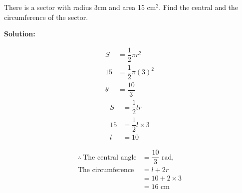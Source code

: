 \documentclass{report}
\newcommand{\sol}{\noindent\textbf{Solution:} }
\begin{document}
\begin{question}
    There is a sector with radius 3cm and area 15 cm$^2$. Find the central and the circumference of the sector.

    \sol{}
    \vspace{-1em}
    \setlength{\columnsep}{-30em}
    \begin{multicols}{2}
        \vspace*{-2.6em}
        \begin{align*}
            S &= \dfrac{1}{2}\pi r^2\\
            15 &= \dfrac{1}{2}\pi(3)^2\\
            \theta &= \dfrac{10}{3}
        \end{align*}
        \begin{align*}
            S &= \dfrac{1}{2}lr\\
            15 &= \dfrac{1}{2}l \times 3\\
            l &= 10
        \end{align*}
    \end{multicols}
    \vspace{-4em}
    \begin{align*}
        \therefore\ \text{The central angle} &= \dfrac{10}{3} \text{ rad,}\\
        \text{The circumference} &= l + 2r\\
        &= 10 + 2 \times 3\\
        &= 16 \text{ cm}
    \end{align*}
\end{question}
\newpage
\end{document}
